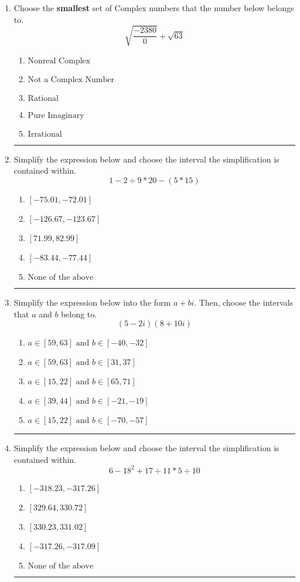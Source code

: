 \documentclass[14pt]{extbook}
\newcommand{\litem}[1]{\item#1\hspace*{-1cm}\rule{\textwidth}{0.4pt}}
\begin{document}
\begin{enumerate}
\litem{
Choose the \textbf{smallest} set of Complex numbers that the number below belongs to.\[ \sqrt{\frac{-2380}{0}}+\sqrt{63} \]\begin{enumerate}[label=\Alph*.]
\item \( \text{Nonreal Complex} \)
\item \( \text{Not a Complex Number} \)
\item \( \text{Rational} \)
\item \( \text{Pure Imaginary} \)
\item \( \text{Irrational} \)

\end{enumerate} }
\litem{
Simplify the expression below and choose the interval the simplification is contained within.\[ 1 - 2 \div 9 * 20 - (5 * 15) \]\begin{enumerate}[label=\Alph*.]
\item \( [-75.01, -72.01] \)
\item \( [-126.67, -123.67] \)
\item \( [71.99, 82.99] \)
\item \( [-83.44, -77.44] \)
\item \( \text{None of the above} \)

\end{enumerate} }
\litem{
Simplify the expression below into the form $a+bi$. Then, choose the intervals that $a$ and $b$ belong to.\[ (5 - 2 i)(8 + 10 i) \]\begin{enumerate}[label=\Alph*.]
\item \( a \in [59, 63] \text{ and } b \in [-40, -32] \)
\item \( a \in [59, 63] \text{ and } b \in [31, 37] \)
\item \( a \in [15, 22] \text{ and } b \in [65, 71] \)
\item \( a \in [39, 44] \text{ and } b \in [-21, -19] \)
\item \( a \in [15, 22] \text{ and } b \in [-70, -57] \)

\end{enumerate} }
\litem{
Simplify the expression below and choose the interval the simplification is contained within.\[ 6 - 18^2 + 17 \div 11 * 5 \div 10 \]\begin{enumerate}[label=\Alph*.]
\item \( [-318.23, -317.26] \)
\item \( [329.64, 330.72] \)
\item \( [330.23, 331.02] \)
\item \( [-317.26, -317.09] \)
\item \( \text{None of the above} \)


\end{enumerate}}
\end{enumerate}
\end{document}
